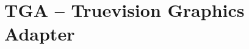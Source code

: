\begin{comment}
  
\end{comment}

\chapter{TGA -- Truevision Graphics Adapter}
\label{cha:tga}

\begin{refsection}

  \cite{91:_truev_tga_file_format_specif}


  \printbibliography[heading=subbibliography]

\end{refsection}